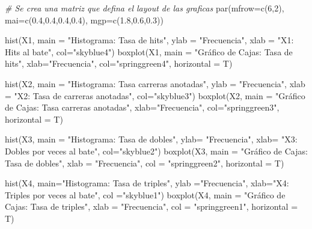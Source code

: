 \documentclass{staprojteamusb}
\newenvironment{Shaded}{\begin{snugshade}}{\end{snugshade}}
\newcommand{\AttributeTok}[1]{\textcolor[rgb]{0.77,0.63,0.00}{#1}}
\newcommand{\CommentTok}[1]{\textcolor[rgb]{0.56,0.35,0.01}{\textit{#1}}}
\newcommand{\DecValTok}[1]{\textcolor[rgb]{0.00,0.00,0.81}{#1}}
\newcommand{\FloatTok}[1]{\textcolor[rgb]{0.00,0.00,0.81}{#1}}
\newcommand{\FunctionTok}[1]{\textcolor[rgb]{0.00,0.00,0.00}{#1}}
\newcommand{\NormalTok}[1]{#1}
\newcommand{\StringTok}[1]{\textcolor[rgb]{0.31,0.60,0.02}{#1}}
\begin{document}
\begin{Shaded}
\begin{Highlighting}[]
\CommentTok{\# Se crea una matriz que defina el layout de las graficas }
\FunctionTok{par}\NormalTok{(}\AttributeTok{mfrow=}\FunctionTok{c}\NormalTok{(}\DecValTok{6}\NormalTok{,}\DecValTok{2}\NormalTok{), }\AttributeTok{mai=}\FunctionTok{c}\NormalTok{(}\FloatTok{0.4}\NormalTok{,}\FloatTok{0.4}\NormalTok{,}\FloatTok{0.4}\NormalTok{,}\FloatTok{0.4}\NormalTok{), }\AttributeTok{mgp=}\FunctionTok{c}\NormalTok{(}\FloatTok{1.8}\NormalTok{,}\FloatTok{0.6}\NormalTok{,}\FloatTok{0.3}\NormalTok{))}

\FunctionTok{hist}\NormalTok{(X1, }\AttributeTok{main =} \StringTok{"Histograma: Tasa de hits"}\NormalTok{, }\AttributeTok{ylab =} \StringTok{"Frecuencia"}\NormalTok{,}
     \AttributeTok{xlab =} \StringTok{"X1: Hits al bate"}\NormalTok{, }\AttributeTok{col=}\StringTok{"skyblue4"}\NormalTok{)}
\FunctionTok{boxplot}\NormalTok{(X1, }\AttributeTok{main =} \StringTok{"Gráfico de Cajas: Tasa de hits"}\NormalTok{, }\AttributeTok{xlab=}\StringTok{"Frecuencia"}\NormalTok{, }
        \AttributeTok{col=}\StringTok{"springgreen4"}\NormalTok{, }\AttributeTok{horizontal =}\NormalTok{ T)}

\FunctionTok{hist}\NormalTok{(X2, }\AttributeTok{main =} \StringTok{"Histograma: Tasa carreras anotadas"}\NormalTok{, }\AttributeTok{ylab =} \StringTok{"Frecuencia"}\NormalTok{, }
     \AttributeTok{xlab =} \StringTok{"X2: Tasa de carreras anotadas"}\NormalTok{, }\AttributeTok{col=}\StringTok{"skyblue3"}\NormalTok{)}
\FunctionTok{boxplot}\NormalTok{(X2, }\AttributeTok{main =} \StringTok{"Gráfico de Cajas: Tasa carreras anotadas"}\NormalTok{, }\AttributeTok{xlab=}\StringTok{"Frecuencia"}\NormalTok{, }
        \AttributeTok{col=}\StringTok{"springgreen3"}\NormalTok{, }\AttributeTok{horizontal =}\NormalTok{ T)}

\FunctionTok{hist}\NormalTok{(X3, }\AttributeTok{main =} \StringTok{"Histograma: Tasa de dobles"}\NormalTok{, }\AttributeTok{ylab=} \StringTok{"Frecuencia"}\NormalTok{, }
     \AttributeTok{xlab=} \StringTok{"X3: Dobles por veces al bate"}\NormalTok{, }\AttributeTok{col=}\StringTok{"skyblue2"}\NormalTok{)}
\FunctionTok{boxplot}\NormalTok{(X3, }\AttributeTok{main =} \StringTok{"Gráfico de Cajas: Tasa de dobles"}\NormalTok{, }\AttributeTok{xlab =} \StringTok{"Frecuencia"}\NormalTok{, }
        \AttributeTok{col =} \StringTok{"springgreen2"}\NormalTok{, }\AttributeTok{horizontal =}\NormalTok{ T)}

\FunctionTok{hist}\NormalTok{(X4, }\AttributeTok{main=}\StringTok{"Histograma: Tasa de triples"}\NormalTok{, }\AttributeTok{ylab =}\StringTok{"Frecuencia"}\NormalTok{, }
     \AttributeTok{xlab=}\StringTok{"X4: Triples por veces al bate"}\NormalTok{, }\AttributeTok{col =}\StringTok{"skyblue1"}\NormalTok{)}
\FunctionTok{boxplot}\NormalTok{(X4, }\AttributeTok{main =} \StringTok{"Gráfico de Cajas: Tasa de triples"}\NormalTok{, }\AttributeTok{xlab =} \StringTok{"Frecuencia"}\NormalTok{, }
        \AttributeTok{col =} \StringTok{"springgreen1"}\NormalTok{, }\AttributeTok{horizontal =}\NormalTok{ T)}


\end{Highlighting}
\end{Shaded}
\end{document}
